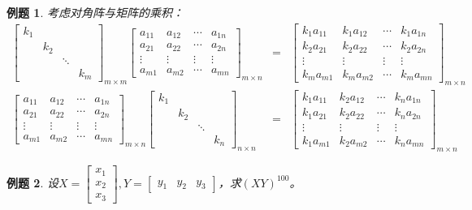 \documentclass[a4paper]{book}
\newtheorem{eg}{例题}[chapter]
\begin{document}
\begin{eg}
考虑对角阵与矩阵的乘积：
\begin{eqnarray*}
\begin{bmatrix}
k_1 & & & \\ & k_2 & & \\ & & \ddots & \\ & & & k_m
\end{bmatrix}_{m\times m}
\begin{bmatrix}
a_{11} & a_{12} & \cdots & a_{1n} \\ a_{21} & a_{22} & \cdots & a_{2n} \\ \vdots & \vdots & \vdots & \vdots \\ a_{m1} & a_{m2} & \cdots & a_{mn}
\end{bmatrix}_{m\times n}
& = & \begin{bmatrix}
k_1 a_{11} & k_1 a_{12} & \cdots & k_1 a_{1n} \\ k_2 a_{21} & k_2 a_{22} & \cdots & k_2 a_{2n} \\ \vdots & \vdots & \vdots & \vdots \\ k_m a_{m1} & k_m a_{m2} & \cdots & k_m a_{mn}
\end{bmatrix}_{m\times n} \\
\begin{bmatrix}
a_{11} & a_{12} & \cdots & a_{1n} \\ a_{21} & a_{22} & \cdots & a_{2n} \\ \vdots & \vdots & \vdots & \vdots \\ a_{m1} & a_{m2} & \cdots & a_{mn}
\end{bmatrix}_{m\times n}
\begin{bmatrix}
k_1 & & & \\ & k_2 & & \\ & & \ddots & \\ & & & k_n
\end{bmatrix}_{n\times n}
& = & \begin{bmatrix}
k_1 a_{11} & k_2 a_{12} & \cdots & k_n a_{1n} \\ k_1 a_{21} & k_2 a_{22} & \cdots & k_n a_{2n} \\ \vdots & \vdots & \vdots & \vdots \\ k_1 a_{m1} & k_2 a_{m2} & \cdots & k_n a_{mn}
\end{bmatrix}_{m\times n}
\end{eqnarray*}
\end{eg}

\begin{eg}
设$X = \begin{bmatrix} x_1 \\ x_2 \\ x_3 \end{bmatrix}, Y = \begin{bmatrix} y_1 & y_2 & y_3 \end{bmatrix}$，求$(XY)^{100}$。
\end{eg}
\end{document}
